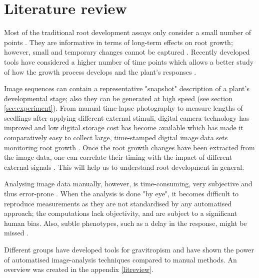 \section{Literature review}

Most of the traditional root development assays only consider a small number of points \cite{parry2001novel,french2009high}. They are informative in terms of long-term effects on root growth; however, small and temporary changes cannot be captured \cite{parry2001novel}.
Recently developed tools have considered a higher number of time points which allows a better study of how the growth process develops and the plant's responses \cite{french2009high,ishikawa1997novel,van2003new,chavarria2008spatio,miller2007computer}.

Image sequences can contain a representative "snapshot" description of a plant's developmental stage; also they can be generated at high speed (see section \ref{sec:experiment}). From manual time-lapse photography \cite{van1934einfluss,michener1938action} to measure lengths of seedlings after applying different external stimuli, digital camera  technology has improved and low digital storage cost has become available which has made it comparatively easy to collect large, time-stamped digital image data sets monitoring root growth \cite{french2009high}.
Once the root growth changes have been extracted from the image data, one can correlate their timing with the impact of different external signals \cite{french2009high}. %
This will help us to understand root development in general. 

Analysing image data manually, however, is time-consuming, very subjective and thus error-prone \cite{french2009high}. When the analysis is done "by eye", it becomes difficult to reproduce measurements as they are not standardised by any automatised approach; the computations lack objectivity, and are subject to a significant human bias. Also, subtle phenotypes, such as a delay in the response, might be missed \cite{french2009high}. 

Different groups have developed tools for gravitropism and have shown the power of automatised image-analysis techniques compared to manual methods. An overview was created in the appendix \ref{litreview}.


